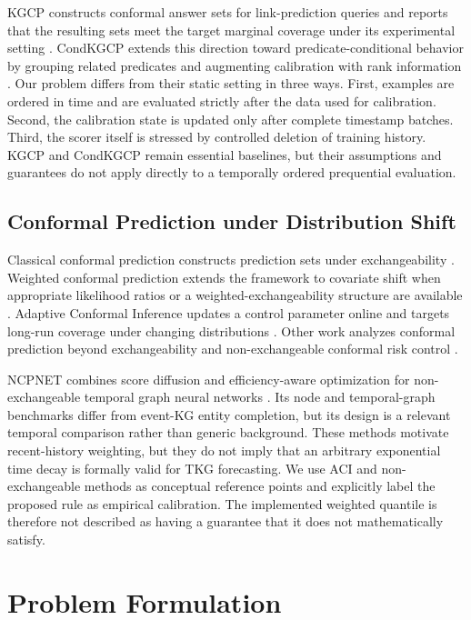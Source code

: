\documentclass[10pt,twocolumn]{article}
\begin{document}
KGCP constructs conformal answer sets for link-prediction queries and reports
that the resulting sets meet the target marginal coverage under its experimental
setting \cite{zhu2025kgcp}. CondKGCP extends this direction toward
predicate-conditional behavior by grouping related predicates and augmenting
calibration with rank information \cite{zhu2025condkgcp}. Our problem differs
from their static setting in three ways. First, examples are ordered in time and are evaluated strictly
after the data used for calibration. Second, the calibration state is updated
only after complete timestamp batches. Third, the scorer itself is stressed by
controlled deletion of training history. KGCP and CondKGCP remain essential
baselines, but their assumptions and guarantees do not apply directly to a
temporally ordered prequential evaluation.

\subsection{Conformal Prediction under Distribution Shift}

Classical conformal prediction constructs prediction sets under exchangeability
\cite{vovk2005algorithmic,angelopoulos2023gentle}. Weighted conformal prediction
extends the framework to covariate shift when appropriate likelihood ratios or a
weighted-exchangeability structure are available
\cite{tibshirani2019covariate}. Adaptive Conformal Inference updates a control
parameter online and targets long-run coverage under changing distributions
\cite{gibbs2021adaptive}. Other work analyzes conformal prediction beyond
exchangeability and non-exchangeable conformal risk control
\cite{barber2023beyond,farinhas2024nexcrc}.

NCPNET combines score diffusion and efficiency-aware optimization for
non-exchangeable temporal graph neural networks \cite{wang2025ncpnet}. Its node
and temporal-graph benchmarks differ from event-KG entity completion, but its
design is a relevant temporal comparison rather than generic background. These
methods motivate recent-history weighting, but they do not imply that an
arbitrary exponential time decay is formally valid for TKG forecasting. We use
ACI and non-exchangeable methods as conceptual reference points and explicitly
label the proposed rule as empirical calibration. The implemented weighted
quantile is therefore not described as having a guarantee that it does not
mathematically satisfy.

\section{Problem Formulation}
\label{sec:problem}
\end{document}
